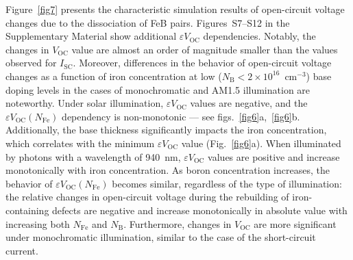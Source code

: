 \documentclass[a4paper,fleqn]{cas-sc}
\begin{document}
Figure~\ref{fig7} presents the characteristic simulation results of open-circuit voltage changes due to the dissociation of FeB pairs.
Figures~S7--S12 in the Supplementary Material show additional $\varepsilon V_\mathrm{OC}$ dependencies.
Notably, the changes in $V_\mathrm{OC}$ value are almost an order of magnitude smaller than the values observed for $I_\mathrm{SC}$.
Moreover, differences in the behavior of open-circuit voltage changes as a function of iron concentration
at low ($N_\mathrm{B}<2\times10^{16}$~cm$^{-3}$) base doping levels
in the cases of monochromatic and AM1.5 illumination are noteworthy.
Under solar illumination, $\varepsilon V_\mathrm{OC}$ values are negative,
and the $\varepsilon V_\mathrm{OC} \left(N_\mathrm{Fe}\right)$ dependency is non-monotonic --- see figs.~\ref{fig6}a,~\ref{fig6}b.
Additionally, the base thickness significantly impacts the iron concentration,
which correlates with the minimum $\varepsilon V_\mathrm{OC}$ value (Fig.~\ref{fig6}a).
When illuminated by photons with a wavelength of 940~nm, $\varepsilon V_\mathrm{OC}$ values are positive and increase monotonically with iron concentration.
As boron concentration increases, the behavior of $\varepsilon V_\mathrm{OC}\left(N_\mathrm{Fe}\right)$ becomes similar, regardless of the type of illumination:
the relative changes in open-circuit voltage during the rebuilding of iron-containing defects
are negative and increase monotonically in absolute value with increasing both $N_\mathrm{Fe}$ and $N_\mathrm{B}$.
Furthermore, changes in $V_\mathrm{OC}$ are more significant under monochromatic illumination, similar to the case of the short-circuit current.
\end{document}
